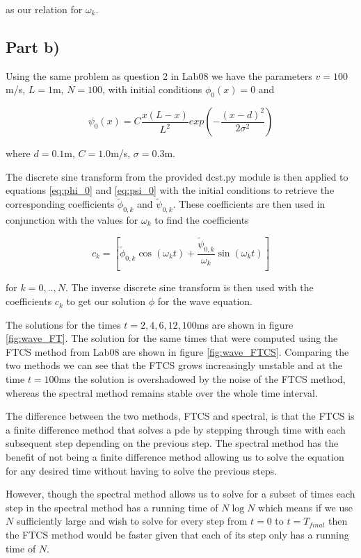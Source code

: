 \documentclass{article}
\begin{document}
as our relation for $\omega_k$.

\subsection{Part b)}
Using the same problem as question 2 in Lab08 we have the parameters $v=100$m/s, $L=1$m, $N=100$, with initial conditions $\phi_0(x) = 0$ and 

\begin{equation}
	\psi_0(x) = C\frac{x(L-x)}{L^2}exp(-\frac{(x-d)^2}{2\sigma^2})
\end{equation}

where $d=0.1$m, $C=1.0$m/s, $\sigma=0.3$m.

The discrete sine transform from the provided dcst.py module is then applied to equations \ref{eq:phi_0} and \ref{eq:psi_0} with the initial conditions to retrieve the corresponding coefficients $\widetilde{\phi}_{0,k}$ and $\widetilde{\psi}_{0,k}$. These coefficients are then used in conjunction with the values for $\omega_k$ to find the coefficients

\begin{equation}
	c_k = \left[ \widetilde{\phi}_{0,k} \cos(\omega_k t) + \frac{\widetilde{\psi}_{0,k}}{\omega_k} \sin(\omega_k t) \right]
\end{equation}

for $k=0,..,N$. The inverse discrete sine transform is then used with the coefficients $c_k$ to get our solution $\phi$ for the wave equation.

The solutions for the times $t=2,4,6,12,100$ms  are shown in figure \ref{fig:wave_FT}. The solution for the same times that were computed using the FTCS method from Lab08 are shown in figure \ref{fig:wave_FTCS}. Comparing the two methods we can see that the FTCS grows increasingly unstable and at the time $t=100$ms the solution is overshadowed by the noise of the FTCS method, whereas the spectral method remains stable over the whole time interval.

The difference between the two methods, FTCS and spectral, is that the FTCS is a finite difference method that solves a pde by stepping through time with each subsequent step depending on the previous step. The spectral method has the benefit of not being a finite difference method allowing us to solve the equation for any desired time without having to solve the previous steps.

However, though the spectral method allows us to solve for a subset of times each step in the spectral method has a running time of $N\log N$ which means if we use $N$ sufficiently large and wish to solve for every step from $t=0$ to $t=T_{final}$ then the FTCS method would be faster given that each of its step only has a running time of $N$.
\end{document}
